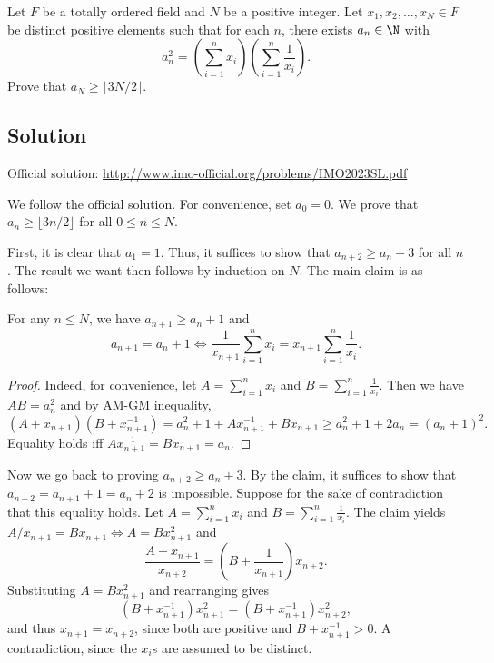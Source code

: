 Let $F$ be a totally ordered field and $N$ be a positive integer.
Let $x_1, x_2, \ldots, x_N \in F$ be distinct positive elements such that for each $n$, there exists $a_n \in \N$ with
\[ a_n^2 = \left(\sum_{i = 1}^n x_i\right) \left(\sum_{i = 1}^n \frac{1}{x_i}\right). \]
Prove that $a_N \geq \lfloor 3N/2 \rfloor$.



\subsection*{Solution}

Official solution: \url{http://www.imo-official.org/problems/IMO2023SL.pdf}

We follow the official solution.
For convenience, set $a_0 = 0$.
We prove that $a_n \geq \lfloor 3n/2 \rfloor$ for all $0 \leq n \leq N$.

First, it is clear that $a_1 = 1$.
Thus, it suffices to show that $a_{n + 2} \geq a_n + 3$ for all $n$.
The result we want then follows by induction on $N$.
The main claim is as follows:

\begin{claim}
For any $n \leq N$, we have $a_{n + 1} \geq a_n + 1$ and
\[ a_{n + 1} = a_n + 1 \iff \frac{1}{x_{n + 1}} \sum_{i = 1}^n x_i = x_{n + 1} \sum_{i = 1}^n \frac{1}{x_i}. \]
\end{claim}
\begin{proof}
Indeed, for convenience, let $A = \sum_{i = 1}^n x_i$ and $B = \sum_{i = 1}^n \frac{1}{x_i}$.
Then we have $AB = a_n^2$ and by AM-GM inequality,
\[ (A + x_{n + 1})(B + x_{n + 1}^{-1}) = a_n^2 + 1 + A x_{n + 1}^{-1} + B x_{n + 1} \geq a_n^2 + 1 + 2 a_n = (a_n + 1)^2. \]
Equality holds iff $A x_{n + 1}^{-1} = B x_{n + 1} = a_n$.
\end{proof}

Now we go back to proving $a_{n + 2} \geq a_n + 3$.
By the claim, it suffices to show that $a_{n + 2} = a_{n + 1} + 1 = a_n + 2$ is impossible.
Suppose for the sake of contradiction that this equality holds.
Let $A = \sum_{i = 1}^n x_i$ and $B = \sum_{i = 1}^n \frac{1}{x_i}$.
The claim yields $A/x_{n + 1} = B x_{n + 1} \iff A = B x_{n + 1}^2$ and
\[ \frac{A + x_{n + 1}}{x_{n + 2}} = \left(B + \frac{1}{x_{n + 1}}\right) x_{n + 2}. \]
Substituting $A = B x_{n + 1}^2$ and rearranging gives
\[ (B + x_{n + 1}^{-1}) x_{n + 1}^2 = (B + x_{n + 1}^{-1}) x_{n + 2}^2, \]
    and thus $x_{n + 1} = x_{n + 2}$, since both are positive and $B + x_{n + 1}^{-1} > 0$.
A contradiction, since the $x_i$s are assumed to be distinct.
